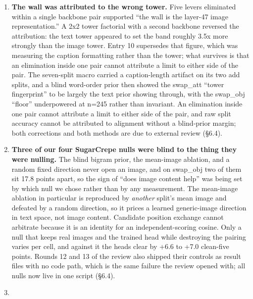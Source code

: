 \documentclass[
  11pt,
]{article}
\begin{document}
\begin{enumerate}
  of its parents, and compositional training erases a drift-trained
  head's family-nulling. The obvious explanation, 1,024 dimensions as a
  capacity budget, was tested and refuted: projections of rank 2,048 and
  4,096 reproduce macro 0.705 exactly. The competition among trained
  properties lives in the objective and the data, not the width (§6.4,
  §7.3).
\item
  \textbf{The wall was attributed to the wrong tower.} Five levers
  eliminated within a single backbone pair supported ``the wall is the
  layer-47 image representation.'' A 2x2 tower factorial with a second
  backbone reversed the attribution: the text tower appeared to set the
  band roughly 3.5x more strongly than the image tower. Entry 10
  supersedes that figure, which was measuring the caption formatting
  rather than the tower; what survives is that an elimination inside one
  pair cannot attribute a limit to either side of the pair. The
  seven-split macro carried a caption-length artifact on its two add
  splits, and a blind word-order prior then showed the swap\_att ``tower
  fingerprint'' to be largely the text prior showing through, with the
  swap\_obj ``floor'' underpowered at n=245 rather than invariant. An
  elimination inside one pair cannot attribute a limit to either side of
  the pair, and raw split accuracy cannot be attributed to alignment
  without a blind-prior margin; both corrections and both methods are
  due to external review (§6.4).
\item
  \textbf{Three of our four SugarCrepe nulls were blind to the thing
  they were nulling.} The blind bigram prior, the mean-image ablation,
  and a random fixed direction never open an image, and on swap\_obj two
  of them sit 17.8 points apart, so the sign of ``does image content
  help'' was being set by which null we chose rather than by any
  measurement. The mean-image ablation in particular is reproduced by
  \emph{another} split's mean image and defeated by a random direction,
  so it prices a learned generic-image direction in text space, not
  image content. Candidate position exchange cannot arbitrate because it
  is an identity for an independent-scoring cosine. Only a null that
  keeps real images and the trained head while destroying the pairing
  varies per cell, and against it the heads clear by +6.6 to +7.0
  clean-five points. Rounds 12 and 13 of the review also shipped their
  controls as result files with no code path, which is the same failure
  the review opened with; all nulls now live in one script (§6.4).
\item

\end{enumerate}
\end{document}
